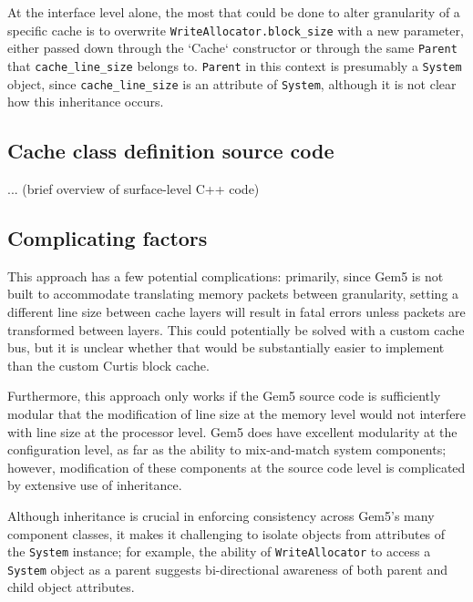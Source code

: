 \documentclass[12pt,twoside]{reedthesis}
\begin{document}
	At the interface level alone, the most that could be done to alter granularity of a specific cache is to overwrite \verb`WriteAllocator.block_size` with a new parameter, either passed down through the `Cache` constructor or through the same \verb`Parent` that \verb`cache_line_size` belongs to. \verb`Parent` in this context is presumably a \verb`System` object, since \verb`cache_line_size` is an attribute of \verb`System`, although it is not clear how this inheritance occurs.

	\subsection*{Cache class definition source code}

	... (brief overview of surface-level C++ code)
	\vspace{2in}

	\subsection*{Complicating factors}

	This approach has a few potential complications: primarily, since Gem5 is not built to accommodate translating memory packets between granularity, setting a different line size between cache layers will result in fatal errors unless packets are transformed between layers. This could potentially be solved with a custom cache bus, but it is unclear whether that would be substantially easier to implement than the custom Curtis block cache.

	Furthermore, this approach only works if the Gem5 source code is sufficiently modular that the modification of line size at the memory level would not interfere with line size at the processor level. Gem5 does have excellent modularity at the configuration level, as far as the ability to mix-and-match system components; however, modification of these components at the source code level is complicated by extensive use of inheritance.
	
	Although inheritance is crucial in enforcing consistency across Gem5's many component classes, it makes it challenging to isolate objects from attributes of the \verb`System` instance; for example, the ability of \verb`WriteAllocator` to access a \verb`System` object as a parent suggests bi-directional awareness of both parent and child object attributes.
\end{document}
